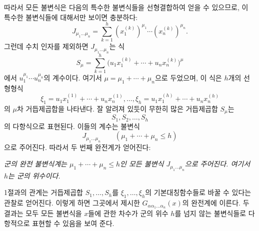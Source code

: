 따라서 모든 불변식은 다음의 특수한 불변식들을 선형결합하여 얻을 수 있으므로, 이 특수한 불변식들에 대해서만 보이면 충분하다:
\[
  J_{\mu_1\ldots\mu_n}
  =\sum_{k=1}^{h}(x_1^{(k)})^{\mu_1}\cdots(x_n^{(k)})^{\mu_n}.
\]
그런데 수치 인자를 제외하면 $J_{\mu_1\ldots\mu_n}$는 식
\[
  S_\mu=\sum_{k=1}^{h}
  \bigl(u_1x_1^{(k)}+\cdots+u_nx_n^{(k)}\bigr)^{\mu}
\]
에서 $u_1^{\mu_1}\cdots u_n^{\mu_n}$의 계수이다. 여기서 $\mu=\mu_1+\cdots+\mu_n$으로 두었으며, 이 식은 $h$개의 선형형식
\[
  \xi_1=u_1x_1^{(1)}+\cdots+u_nx_n^{(1)},\ldots,
  \xi_h=u_1x_1^{(h)}+\cdots+u_nx_n^{(h)}
\]
의 $\mu$차 거듭제곱합을 나타낸다. 잘 알려져 있듯이 무한히 많은 거듭제곱합 $S_\mu$는
\[
  S_1,S_2,\ldots,S_h
\]
의 다항식으로 표현된다. 이들의 계수는 불변식
\[
  J_{\mu_1\ldots\mu_n}\qquad(\mu_1+\cdots+\mu_n\le h)
\]
으로 주어진다. 따라서 두 번째 완전계가 얻어진다:

\emph{군의 완전 불변식계는 $\mu_1+\cdots+\mu_n\le h$인 모든 불변식 $J_{\mu_1\ldots\mu_n}$으로 주어진다. 여기서 $h$는 군의 위수이다.}

1절과의 관계는 거듭제곱합 $S_1,\ldots,S_h$를 $\xi_1,\ldots,\xi_h$의 기본대칭함수들로 바꿀 수 있다는 관찰로 얻어진다. 이렇게 하면 그곳에서 제시한 $G_{\alpha\alpha_1\ldots\alpha_n}(x)$의 완전계에 이른다. 두 결과는 모두 모든 불변식을 $x$들에 관한 차수가 군의 위수 $h$를 넘지 않는 불변식들로 다항적으로 표현할 수 있음을 보여 준다.

